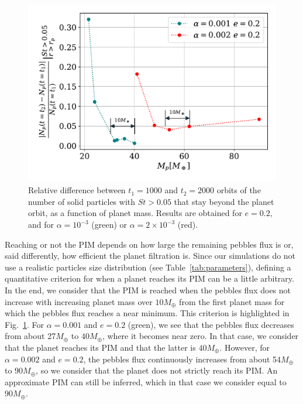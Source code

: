 \documentclass[fleqn,usenatbib]{mnras}
\begin{document}
\begin{figure}
	\includegraphics[scale=0.5]{Permeability_new.pdf}
    \caption{Relative difference between $t_1 = 1000$ and $t_2 = 2000$ orbits of the number of solid particles with $St >0.05$ that stay beyond the planet orbit, as a function of planet mass. Results are obtained for $e=0.2$, and for $\alpha = 10^{-3}$ (green) or $\alpha = 2\times 10^{-3}$ (red).}
    \label{fig:criterion}
\end{figure}
Reaching or not the PIM depends on how large the remaining pebbles flux is or, said differently, how efficient the planet filtration is. Since our simulations do not use a realistic particles size distribution (see Table~\ref{tab:parameters}), defining a quantitative criterion for when a planet reaches its PIM can be a little arbitrary. In the end, we consider that the PIM is reached when the pebbles flux does not increase with increasing planet mass over $10M_\oplus$ from the first planet mass for which the pebbles flux reaches a near minimum. This criterion is highlighted in Fig.~\ref{fig:criterion}.
For $\alpha=0.001$ and $e=0.2$ (green), we see that the pebbles flux decreases from about 27$M_\oplus$ to $40M_\oplus$, where it becomes near zero. In that case, we consider that the planet reaches its PIM and that the latter is $40M_\oplus$. However, for $\alpha=0.002$ and $e=0.2$, the pebbles flux continuously increases from about 54$M_\oplus$ to $90M_\oplus$, so we consider that the planet does not strictly reach its PIM. An approximate PIM can still be inferred, which in that case we consider equal to $90M_\oplus$.
\end{document}
